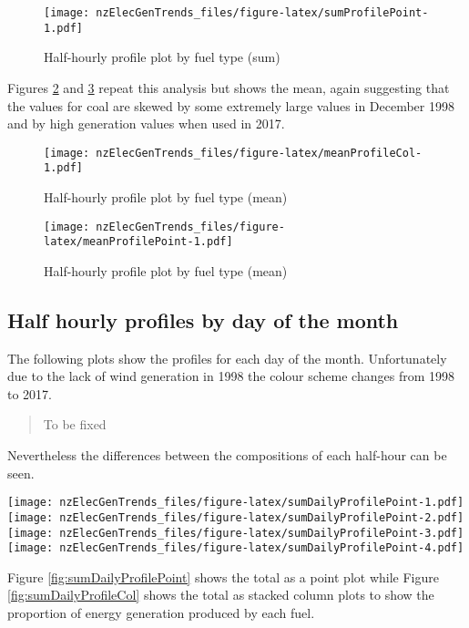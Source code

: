\documentclass[]{article}
\theoremstyle{definition}
\theoremstyle{definition}
\theoremstyle{definition}
\theoremstyle{remark}
\begin{document}
\begin{figure}
\centering
\texttt{[image: nzElecGenTrends\_files/figure-latex/sumProfilePoint-1.pdf]}
\caption{\label{fig:sumProfilePoint}Half-hourly profile plot by fuel type
(sum)}
\end{figure}

Figures \ref{fig:meanProfileCol} and \ref{fig:meanProfilePoint} repeat
this analysis but shows the mean, again suggesting that the values for
coal are skewed by some extremely large values in December 1998 and by
high generation values when used in 2017.

\begin{figure}
\centering
\texttt{[image: nzElecGenTrends\_files/figure-latex/meanProfileCol-1.pdf]}
\caption{\label{fig:meanProfileCol}Half-hourly profile plot by fuel type
(mean)}
\end{figure}

\begin{figure}
\centering
\texttt{[image: nzElecGenTrends\_files/figure-latex/meanProfilePoint-1.pdf]}
\caption{\label{fig:meanProfilePoint}Half-hourly profile plot by fuel type
(mean)}
\end{figure}

\subsection{Half hourly profiles by day of the
month}\label{half-hourly-profiles-by-day-of-the-month}

The following plots show the profiles for each day of the month.
Unfortunately due to the lack of wind generation in 1998 the colour
scheme changes from 1998 to 2017.

\begin{quote}
To be fixed
\end{quote}

Nevertheless the differences between the compositions of each half-hour
can be seen.

\texttt{[image: nzElecGenTrends\_files/figure-latex/sumDailyProfilePoint-1.pdf]}
\texttt{[image: nzElecGenTrends\_files/figure-latex/sumDailyProfilePoint-2.pdf]}
\texttt{[image: nzElecGenTrends\_files/figure-latex/sumDailyProfilePoint-3.pdf]}
\texttt{[image: nzElecGenTrends\_files/figure-latex/sumDailyProfilePoint-4.pdf]}

Figure \ref{fig:sumDailyProfilePoint} shows the total as a point plot
while Figure \ref{fig:sumDailyProfileCol} shows the total as stacked
column plots to show the proportion of energy generation produced by
each fuel.
\end{document}
